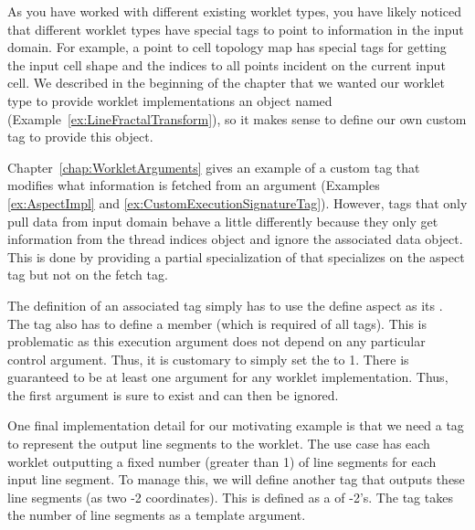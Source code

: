 
As you have worked with different existing worklet types, you have likely noticed that different worklet types have special \executionsignature tags to point to information in the input domain.
For example, a point to cell topology map has special \executionsignature tags for getting the input cell shape and the indices to all points incident on the current input cell.
We described in the beginning of the chapter that we wanted our worklet type to provide worklet implementations an object named  (Example~\ref{ex:LineFractalTransform}), so it makes sense to define our own custom \executionsignature tag to provide this object.

Chapter~\ref{chap:WorkletArguments} gives an example of a custom \executionsignature tag that modifies what information is fetched from an argument (Examples \ref{ex:AspectImpl} and \ref{ex:CustomExecutionSignatureTag}).
However, \executionsignature tags that only pull data from input domain behave a little differently because they only get information from the thread indices object and ignore the associated data object.
This is done by providing a partial specialization of  that specializes on the aspect tag but not on the fetch tag.


The definition of an associated \executionsignature tag simply has to use the define aspect as its .
The tag also has to define a  member (which is required of all \executionsignature tags).
This is problematic as this execution argument does not depend on any particular control argument.
Thus, it is customary to simply set the  to 1.
There is guaranteed to be at least one \controlsignature argument for any worklet implementation.
Thus, the first argument is sure to exist and can then be ignored.


One final implementation detail for our motivating example is that we need a \controlsignature tag to represent the output line segments to the worklet.
The use case has each worklet outputting a fixed number (greater than 1) of line segments for each input line segment.
To manage this, we will define another \controlsignature tag that outputs these line segments (as two -2 coordinates).
This is defined as a  of -2's.
The tag takes the number of line segments as a template argument.

